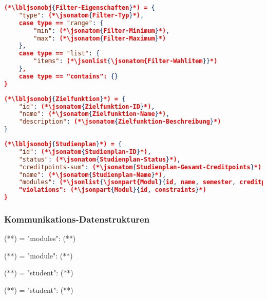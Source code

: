 \begin{lstlisting}[language=json]
(*\lbljsonobj{Filter-Eigenschaften}*) = {
	"type": (*\jsonatom{Filter-Typ}*),
	case type == "range": {
		"min": (*\jsonatom{Filter-Minimum}*),
		"max": (*\jsonatom{Filter-Maximum}*)
	},
	case type == "list": {
		"items": (*\jsonlist{\jsonatom{Filter-Wahlitem}}*)
	},
	case type == "contains": {}
}
\end{lstlisting}

\begin{lstlisting}[language=json]
(*\lbljsonobj{Zielfunktion}*) = {
	"id": (*\jsonatom{Zielfunktion-ID}*),
	"name": (*\jsonatom{Zielfunktion-Name}*),
	"description": (*\jsonatom{Zielfunktion-Beschreibung}*)
}
\end{lstlisting}

\begin{lstlisting}[language=json]
(*\lbljsonobj{Studienplan}*) = {
    "id": (*\jsonatom{Studienplan-ID}*),
    "status": (*\jsonatom{Studienplan-Status}*),
    "creditpoints-sum": (*\jsonatom{Studienplan-Gesamt-Creditpoints}*),
    "name": (*\jsonatom{Studienplan-Name}*),
    "modules": (*\jsonlist{\jsonpart{Modul}{id, name, semester, creditpoints, lecturer}}*),
    "violations": (*\jsonpart{Modul}{id, constraints}*)	
}
\end{lstlisting}

\subsubsection*{Kommunikations-Datenstrukturen}

\begin{json}
(**) = {
	"modules": (**)
}	
\end{json}

\begin{json}
(**) = {
	"module": (**)
}	
\end{json}

\begin{json}
(**) = {
	"student": (**)
}	
\end{json}

\begin{json}
(**) = {
	"student": (**)
}	
\end{json}

